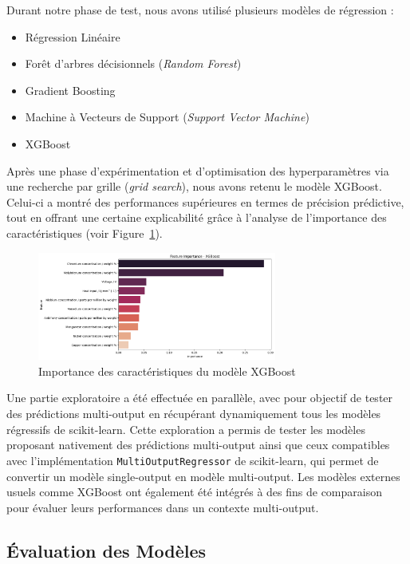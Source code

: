 \documentclass{article}
\begin{document}
Durant notre phase de test, nous avons utilisé plusieurs modèles de régression :

\begin{itemize}
\item Régression Linéaire
\item Forêt d’arbres décisionnels (\textit{Random Forest})
\item Gradient Boosting
\item Machine à Vecteurs de Support (\textit{Support Vector Machine})
\item XGBoost
\end{itemize}

Après une phase d’expérimentation et d’optimisation des hyperparamètres via une recherche par grille (\textit{grid search}), nous avons retenu le modèle XGBoost. Celui-ci a montré des performances supérieures en termes de précision prédictive, tout en offrant une certaine explicabilité grâce à l’analyse de l’importance des caractéristiques (voir Figure~\ref{fig:xgboost_feature_importance}).

\begin{figure}[H]
    \centering
    \includegraphics[width=0.7\textwidth]{images/xgboost_feature_importance.png}
    \caption{Importance des caractéristiques du modèle XGBoost}
    \label{fig:xgboost_feature_importance}
\end{figure}

Une partie exploratoire a été effectuée en parallèle, avec pour objectif de tester des prédictions multi-output en récupérant dynamiquement tous les modèles régressifs de scikit-learn. Cette exploration a permis de tester les modèles proposant nativement des prédictions multi-output ainsi que ceux compatibles avec l’implémentation \texttt{MultiOutputRegressor} de scikit-learn, qui permet de convertir un modèle single-output en modèle multi-output. Les modèles externes usuels comme XGBoost ont également été intégrés à des fins de comparaison pour évaluer leurs performances dans un contexte multi-output.

\subsection{Évaluation des Modèles}
\end{document}
